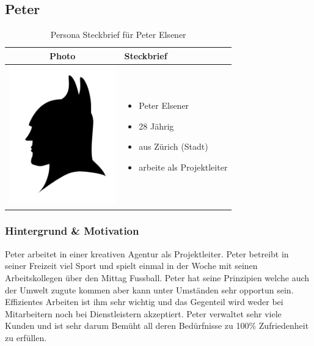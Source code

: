 \begin{description}
\subsection{Peter}

\begin{table}[h!]
  \centering
  \begin{tabular}{ | c | m{5cm} | }
    \hline
    Photo & Steckbrief \\ \hline
    \begin{minipage}{.3\textwidth}
      \includegraphics[width=\linewidth, height=60mm]{images/batman.jpg}
    \end{minipage}
    &
      \begin{itemize}
        \item Peter Elsener
        \item 28 Jährig
        \item aus Zürich (Stadt)
        \item arbeite als Projektleiter
      \end{itemize}
    \\ \hline
  \end{tabular}
  \caption{Persona Steckbrief für Peter Elsener}\label{tbl:steckbriefpeter}
\end{table}

\subsubsection{Hintergrund \& Motivation}
Peter arbeitet in einer kreativen Agentur als Projektleiter. Peter betreibt in seiner Freizeit viel Sport und spielt einmal in der Woche mit seinen Arbeitskollegen über den Mittag Fussball. Peter hat seine Prinzipien welche auch der Umwelt zugute kommen aber kann unter Umständen sehr opportun sein. Effizientes Arbeiten ist ihm sehr wichtig und das Gegenteil wird weder bei Mitarbeitern noch bei Dienstleistern akzeptiert. Peter verwaltet sehr viele Kunden und ist sehr darum Bemüht all deren Bedürfnisse zu 100\% Zufriedenheit zu erfüllen.


\end{description}
